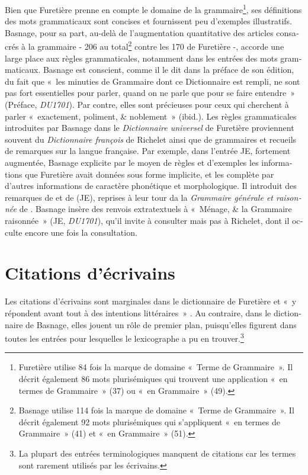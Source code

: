 \documentclass[output=paper,colorlinks,citecolor=brown,arabicfont,chinesefont,booklanguage=french]{langscibook}
\begin{document}
\begin{otherlanguage}{french}
Bien que Furetière prenne en compte le domaine de la grammaire\footnote{Furetière utilise 84 fois la marque de domaine «~Terme de Grammaire~». Il décrit également 86 mots plurisémiques qui trouvent une application «~en termes de Grammaire~» (37) ou «~en Grammaire~» (49).}, ses définitions des mots grammaticaux sont concises et fournissent peu d'exemples illustratifs. Basnage, pour sa part, au-delà de l'augmentation quantitative des articles consacrés à la grammaire - 206 au total\footnote{Basnage utilise 114 fois la marque de domaine «~Terme de Grammaire~». Il décrit également 92 mots plurisémiques qui s’appliquent «~en termes de Grammaire~» (41) et «~en Grammaire~» (51).} contre les 170 de Furetière -, accorde une large place aux règles grammaticales, notamment dans les entrées des mots grammaticaux. Basnage est conscient, comme il le dit dans la préface de son édition, du fait que «~les minuties de Grammaire dont ce Dictionnaire est rempli, ne sont pas fort essentielles pour parler, quand on ne parle que pour se faire entendre~» (Préface, \emph{DU1701}). Par contre, elles sont précieuses pour ceux qui cherchent à parler «~exactement, poliment, \& noblement~» (ibid.). Les règles grammaticales introduites par Basnage dans le \emph{Dictionnaire universel} de Furetière proviennent souvent du \emph{Dictionnaire françois} de Richelet ainsi que de grammaires et recueils de remarques sur la langue française. Par exemple, dans l’entrée JE, fortement augmentée, Basnage explicite par le moyen de règles et d’exemples les informations que Furetière avait données sous forme implicite, et les complète par d'autres informations de caractère phonétique et morphologique. Il introduit des remarques de \citet[115]{Menage1672} et de \citet{Richelet1693} (JE), reprises à leur tour da la \emph{Grammaire générale et raisonnée} de \citet[35]{ArnaudLancelot1660}. Basnage insère des renvois extratextuels à «~Ménage, \& la Grammaire raisonnée~» (JE, \emph{DU1701}), qu'il invite à consulter mais pas à Richelet, dont il occulte encore une fois la consultation.

\section{Citations d’écrivains}

Les citations d’écrivains sont marginales dans le dictionnaire de Furetière et «~y répondent avant tout à des intentions littéraires~» \citep[49]{Lehmann1995}. Au contraire, dans le dictionnaire de Basnage, elles jouent un rôle de premier plan, puisqu'elles figurent dans toutes les entrées pour lesquelles le lexicographe a pu en trouver.\footnote{La plupart des entrées terminologiques manquent de citations car les termes sont rarement utilisés par les écrivains.}


\end{otherlanguage}
\end{document}
